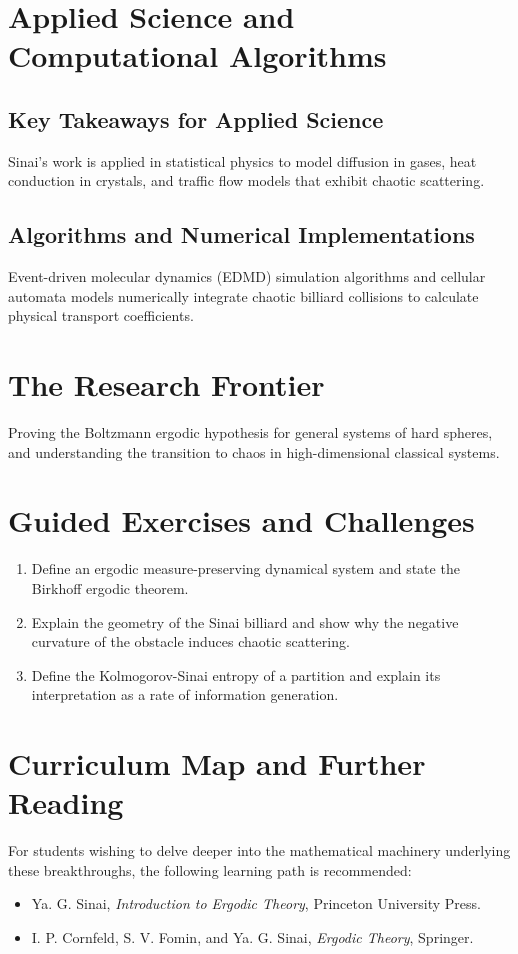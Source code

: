 \section{Applied Science and Computational Algorithms}
\subsection{Key Takeaways for Applied Science}
Sinai's work is applied in statistical physics to model diffusion in gases, heat conduction in crystals, and traffic flow models that exhibit chaotic scattering.

\subsection{Algorithms and Numerical Implementations}
Event-driven molecular dynamics (EDMD) simulation algorithms and cellular automata models numerically integrate chaotic billiard collisions to calculate physical transport coefficients.

\section{The Research Frontier}
Proving the Boltzmann ergodic hypothesis for general systems of hard spheres, and understanding the transition to chaos in high-dimensional classical systems.

\section{Guided Exercises and Challenges}
\begin{enumerate}[label=\textbf{\arabic*.}]
  \item Define an ergodic measure-preserving dynamical system and state the Birkhoff ergodic theorem.
  \item Explain the geometry of the Sinai billiard and show why the negative curvature of the obstacle induces chaotic scattering.
  \item Define the Kolmogorov-Sinai entropy of a partition and explain its interpretation as a rate of information generation.
\end{enumerate}

\section{Curriculum Map and Further Reading}
For students wishing to delve deeper into the mathematical machinery underlying these breakthroughs, the following learning path is recommended:
\begin{itemize}
  \item Ya. G. Sinai, \emph{Introduction to Ergodic Theory}, Princeton University Press.
  \item I. P. Cornfeld, S. V. Fomin, and Ya. G. Sinai, \emph{Ergodic Theory}, Springer.
\end{itemize}

